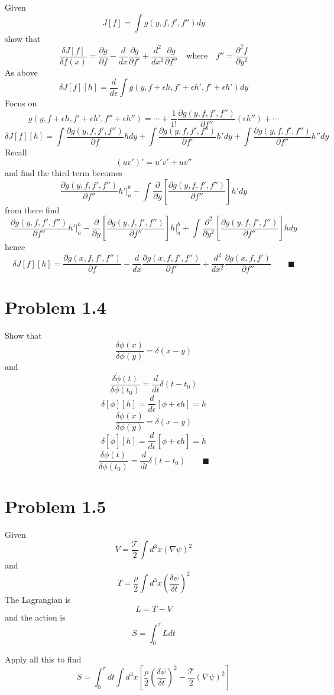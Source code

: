 \documentclass{amsart}
\begin{document}
Given \[J[f]=\int g(y,f,f',f'')dy\]
show that \[\frac{\delta J[f]}{\delta f(x)}=\frac{\partial g}{\partial f} -\frac{d}{dx}\frac{\partial g}{\partial f'}+\frac{d^2}{dx^2}\frac{\partial g}{\partial f''} \quad\text{where}\quad f''=\frac{\partial^2 f}{\partial y^2}\]
As above \[\delta J[f][h]=\frac{d}{d\epsilon}\int g\left(y,f+\epsilon h,f'+\epsilon h',f'+\epsilon h'\right)dy\]
Focus on \[g(y,f+\epsilon h,f'+\epsilon h',f''+\epsilon h'')= \cdots +\frac{1}{1!}\frac{\partial g(y,f,f',f'')}{\partial f''}(\epsilon h'') + \cdots \]
\[\delta J[f][h]=\int\frac{\partial g(y,f,f',f'')}{\partial f}hdy+\int\frac{\partial g(y,f,f',f'')}{\partial f'}h'dy+\int\frac{\partial g(y,f,f',f'')}{\partial f''}h''dy\] Recall \[(uv')'=u'v'+uv''\] and find the third term becomes
\[\frac{\partial g(y,f,f',f'')}{\partial f''}h'\Big \vert_a^b-\int\frac{\partial}{\partial y}\left[\frac{\partial g(y,f,f',f'')}{\partial f''}\right]h'dy\]
from there find 
\[\frac{\partial g(y,f,f',f'')}{\partial f''}h'\Big \vert_a^b-\frac{\partial}{\partial y}\left[\frac{\partial g(y,f,f',f'')}{\partial f''}\right]h\Big \vert_a^b+\int\frac{\partial^2}{\partial y^2}\left[\frac{\partial g(y,f,f',f'')}{\partial f''}\right]hdy\]
hence
\[\delta J[f][h]=\frac{\partial g(x,f,f',f'')}{\partial f}-\frac{d}{dx}\frac{\partial g(x,f,f',f'')}{\partial f'}+\frac{d^2}{dx^2}\frac{\partial g(x,f,f')}{\partial f''} \qquad \blacksquare\]


\section*{Problem 1.4}
Show that \[\frac{\delta\phi(x)}{\delta\phi(y)}=\delta(x-y)\]
and \[\frac{\delta\dot{\phi}(t)}{\delta\phi(t_0)}=\frac{d}{dt}\delta(t-t_0)\]
\[\delta[\phi][h]=\frac{d}{d\epsilon}\left[\phi+\epsilon h\right]=h\]
\[\frac{\delta\phi(x)}{\delta\phi(y)}=\delta(x-y)\]
\[\delta[\dot{\phi}][h]=\frac{d}{d\epsilon}\left[\dot{\phi}+\epsilon \dot{h}\right]=\dot{h}\]
\[\frac{\delta\dot{\phi}(t)}{\delta\phi(t_0)}=\frac{d}{dt}\delta(t-t_0) \qquad \blacksquare\]


\section*{Problem 1.5}
Given \[V=\frac{\mathcal{T}}{2}\int d^3 x(\nabla\psi)^2\]
and \[T=\frac{\rho}{2}\int d^3 x\left(\frac{\delta \psi}{\delta t}\right)^2\]
The Lagrangian is \[L=T-V\] and the action is \[S=\int_0^\tau Ldt\]

Apply all this to find
\[S=\int_0^\tau dt \int d^3 x\left[\frac{\rho}{2}\left(\frac{\delta \psi}{\delta t}\right)^2 - \frac{\mathcal{T}}{2}(\nabla\psi)^2 \right]\]
\end{document}
